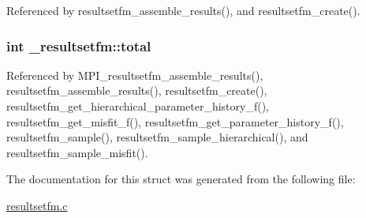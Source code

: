 Referenced by resultsetfm\+\_\+assemble\+\_\+results(), and resultsetfm\+\_\+create().

\subsubsection[{\texorpdfstring{total}{total}}]{\setlength{\rightskip}{0pt plus 5cm}int \+\_\+resultsetfm\+::total}\hypertarget{struct__resultsetfm_a7cdd1aeb9f8871bb982f13ca61625aac}{}\label{struct__resultsetfm_a7cdd1aeb9f8871bb982f13ca61625aac}


Referenced by M\+P\+I\+\_\+resultsetfm\+\_\+assemble\+\_\+results(), resultsetfm\+\_\+assemble\+\_\+results(), resultsetfm\+\_\+create(), resultsetfm\+\_\+get\+\_\+hierarchical\+\_\+parameter\+\_\+history\+\_\+f(), resultsetfm\+\_\+get\+\_\+misfit\+\_\+f(), resultsetfm\+\_\+get\+\_\+parameter\+\_\+history\+\_\+f(), resultsetfm\+\_\+sample(), resultsetfm\+\_\+sample\+\_\+hierarchical(), and resultsetfm\+\_\+sample\+\_\+misfit().



The documentation for this struct was generated from the following file\+:\begin{DoxyCompactItemize}
\item 
\hyperlink{resultsetfm_8c}{resultsetfm.\+c}\end{DoxyCompactItemize}
